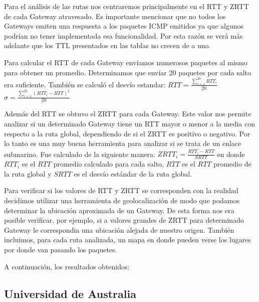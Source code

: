 
Para el análisis de las rutas nos centraremos principalmente en el RTT y ZRTT de cada Gateway atravesado. Es importante mencionar que no todos los Gateways emiten una respuesta a los paquetes ICMP emitidos ya que algunos podrían no tener implementada esa funcionalidad. Por esta razón se verá más adelante que los TTL presentados en las tablas no crecen de a uno.

Para calcular el RTT de cada Gateway envíamos numerosos paquetes al mismo para obtener un promedio. Determinamos que envíar 20 paquetes por cada salto era suficiente. También se calculó el desvío estandar:
\newline
\newline
$RTT=\frac{\sum_{i=1}^{20}{RTT_i}}{20}$
\newline
$\sigma = \frac{\sum_{i=1}^{20}{(RTT_i-RTT)^2}}{20}$
\newline

Además del RTT se obtuvo el ZRTT para cada Gateway. Este valor nos permite analizar si un determinado Gateway tiene un RTT mayor o menor a la media con respecto a la ruta global, dependiendo de si el ZRTT es positivo o negativo. Por lo tanto es una muy buena herramienta para analizar si se trata de un enlace submarino. Fue calculado de la siguiente manera:
\newline
\newline
$ZRTT_i = \frac{RTT_i-\overline{RTT}}{SRTT}$
en donde $RTT_i$ es el $RTT$ promedio calculado para cada salto, $\overline{RTT}$ es el $RTT$ promedio de la ruta global y $SRTT$ es el desvío estándar de la ruta global.
\newline

Para verificar si los valores de RTT y ZRTT se corresponden con la realidad decidimos utilizar una herramienta de geolocalización de modo que podamos determinar la ubicación aproximada de un Gateway. De esta forma nos era posible verificar, por ejemplo, si a valores grandes de ZRTT para determinado Gateway le correspondia una ubicación alejada de nuestro origen. También incluimos, para cada ruta analizada, un mapa en donde pueden verse los lugares por donde van pasando los paquetes.

A continuación, los resultados obtenidos:

\subsection{Universidad de Australia}

